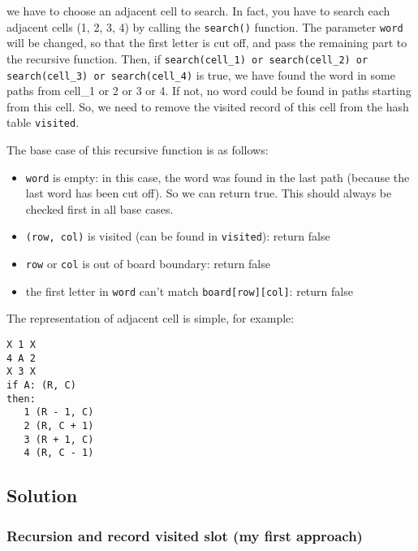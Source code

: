 \documentclass[12pt]{article}
\begin{document}
we have to choose an adjacent cell to search. In fact, you have to search each adjacent cells (1, 2, 3, 4) by calling the \texttt{search()} function. The parameter \texttt{word} will be changed, so that the first letter is cut off, and pass the remaining part to the recursive function. Then, if \texttt{search(cell\_1) or search(cell\_2) or search(cell\_3) or search(cell\_4)} is true, we have found the word in some paths from cell\_1 or 2 or 3 or 4. If not, no word could be found in paths starting from this cell. So, we need to remove the visited record of this cell from the hash table \texttt{visited}.

The base case of this recursive function is as follows:
\begin{itemize}
\item \texttt{word} is empty: in this case, the word was found in the last path (because the last word has been cut off). So we can return true. This should always be checked first in all base cases.
\item \texttt{(row, col)} is visited (can be found in \texttt{visited}): return false
\item \texttt{row} or \texttt{col} is out of board boundary: return false
\item the first letter in \texttt{word} can't match \texttt{board[row][col]}: return false
\end{itemize}

The representation of adjacent cell is simple, for example:
\begin{verbatim}
X 1 X
4 A 2
X 3 X
if A: (R, C)
then:
   1 (R - 1, C)
   2 (R, C + 1)
   3 (R + 1, C)
   4 (R, C - 1)
\end{verbatim}

\subsection{Solution}
\label{sec:org6fe732e}
\subsubsection{Recursion and record visited slot (my first approach)}
\label{sec:org2044ce5}
\end{document}
